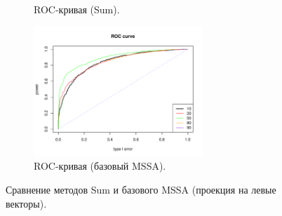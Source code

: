 \documentclass[specialist,
substylefile = spbu_report.rtx,
subf,href,colorlinks=true, 12pt]{disser}
\theoremstyle{definition}
\begin{document}
\begin{figure}[h!]
\begin{subfigure}[t]{0.45\textwidth}
		\caption{ROC-кривая (Sum).}
	\end{subfigure}\hspace{\fill}
	\begin{subfigure}[t]{0.45\textwidth}
		\centering
		\includegraphics[width=0.7\textwidth]{img/roc_mssa_ev.pdf}
		\caption{ROC-кривая (базовый MSSA).}
	\end{subfigure}
	\caption{Сравнение методов Sum и базового MSSA (проекция на левые векторы).}
	\label{fig:sum_ev}
\end{figure}
\end{document}

